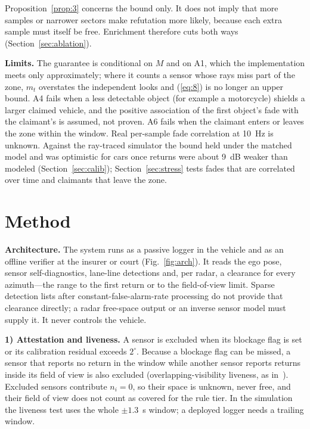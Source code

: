 Proposition~\ref{prop:3} concerns the bound only. It does not imply that more samples or narrower sectors make refutation more likely, because each extra sample must itself be free. Enrichment therefore cuts both ways (Section~\ref{sec:ablation}).

\textbf{Limits.} The guarantee is conditional on $M$ and on A1, which the implementation meets only approximately; where it counts a sensor whose rays miss part of the zone, $m_t$ overstates the independent looks and (\ref{eq:8}) is no longer an upper bound. A4 fails when a less detectable object (for example a motorcycle) shields a larger claimed vehicle, and the positive association of the first object's fade with the claimant's is assumed, not proven. A6 fails when the claimant enters or leaves the zone within the window. Real per-sample fade correlation at 10~Hz is unknown. Against the ray-traced simulator the bound held under the matched model and was optimistic for cars once returns were about 9~dB weaker than modeled (Section~\ref{sec:calib}); Section~\ref{sec:stress} tests fades that are correlated over time and claimants that leave the zone.

\section{Method}\label{sec:method}

\textbf{Architecture.} The system runs as a passive logger in the vehicle and as an offline verifier at the insurer or court (Fig.~\ref{fig:arch}). It reads the ego pose, sensor self-diagnostics, lane-line detections and, per radar, a clearance for every azimuth---the range to the first return or to the field-of-view limit. Sparse detection lists after constant-false-alarm-rate processing do not provide that clearance directly; a radar free-space output or an inverse sensor model must supply it. It never controls the vehicle.



\textbf{1) Attestation and liveness.} A sensor is excluded when its blockage flag is set or its calibration residual exceeds $2^\circ$. Because a blockage flag can be missed, a sensor that reports no return in the window while another sensor reports returns inside its field of view is also excluded (overlapping-visibility liveness, as in~\cite{b33}). Excluded sensors contribute $n_i = 0$, so their space is unknown, never free, and their field of view does not count as covered for the rule tier. In the simulation the liveness test uses the whole $\pm 1.3$~s window; a deployed logger needs a trailing window.

